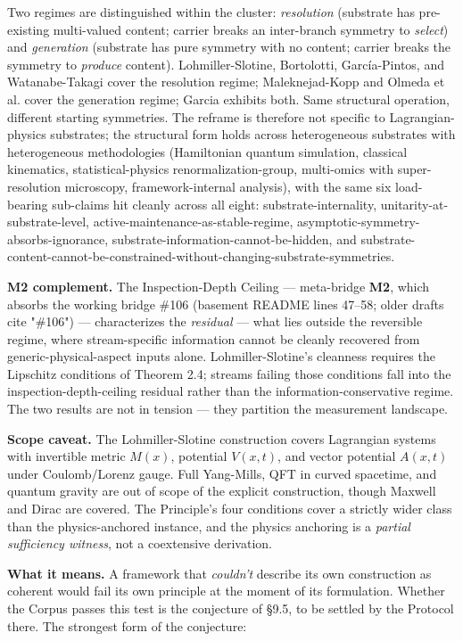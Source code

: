 \documentclass[11pt, openany]{book}
\newcommand{\sectionbreak}{\clearpage}
\begin{document}
Two regimes are distinguished within the cluster: \textit{resolution} (substrate has pre-existing multi-valued content; carrier breaks an inter-branch symmetry to \textit{select}) and \textit{generation} (substrate has pure symmetry with no content; carrier breaks the symmetry to \textit{produce} content). Lohmiller-Slotine, Bortolotti, García-Pintos, and Watanabe-Takagi cover the resolution regime; Maleknejad-Kopp and Olmeda et al. cover the generation regime; Garcia exhibits both. Same structural operation, different starting symmetries. The reframe is therefore not specific to Lagrangian-physics substrates; the structural form holds across heterogeneous substrates with heterogeneous methodologies (Hamiltonian quantum simulation, classical kinematics, statistical-physics renormalization-group, multi-omics with super-resolution microscopy, framework-internal analysis), with the same six load-bearing sub-claims hit cleanly across all eight: substrate-internality, unitarity-at-substrate-level, active-maintenance-as-stable-regime, asymptotic-symmetry-absorbs-ignorance, substrate-information-cannot-be-hidden, and substrate-content-cannot-be-constrained-without-changing-substrate-symmetries.

\textbf{M2 complement.} The Inspection-Depth Ceiling --- meta-bridge \textbf{M2}, which absorbs the working bridge \#106 (basement README lines 47–58; older drafts cite "\#106") --- characterizes the \textit{residual} --- what lies outside the reversible regime, where stream-specific information cannot be cleanly recovered from generic-physical-aspect inputs alone. Lohmiller-Slotine's cleanness requires the Lipschitz conditions of Theorem 2.4; streams failing those conditions fall into the inspection-depth-ceiling residual rather than the information-conservative regime. The two results are not in tension --- they partition the measurement landscape.

\textbf{Scope caveat.} The Lohmiller-Slotine construction covers Lagrangian systems with invertible metric $M(x)$, potential $V(x, t)$, and vector potential $A(x, t)$ under Coulomb/Lorenz gauge. Full Yang-Mills, QFT in curved spacetime, and quantum gravity are out of scope of the explicit construction, though Maxwell and Dirac are covered. The Principle's four conditions cover a strictly wider class than the physics-anchored instance, and the physics anchoring is a \textit{partial sufficiency witness}, not a coextensive derivation.

\sectionbreak

\textbf{What it means.} A framework that \textit{couldn't} describe its own construction as coherent would fail its own principle at the moment of its formulation. Whether the Corpus passes this test is the conjecture of §9.5, to be settled by the Protocol there. The strongest form of the conjecture:
\end{document}
